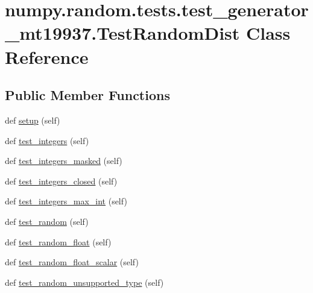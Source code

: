\hypertarget{classnumpy_1_1random_1_1tests_1_1test__generator__mt19937_1_1TestRandomDist}{}\section{numpy.\+random.\+tests.\+test\+\_\+generator\+\_\+mt19937.\+Test\+Random\+Dist Class Reference}
\label{classnumpy_1_1random_1_1tests_1_1test__generator__mt19937_1_1TestRandomDist}
\subsection*{Public Member Functions}
\begin{DoxyCompactItemize}
\item 
def \hyperlink{classnumpy_1_1random_1_1tests_1_1test__generator__mt19937_1_1TestRandomDist_a41df3d91f32b0588e1f120037f13ebbc}{setup} (self)
\item 
def \hyperlink{classnumpy_1_1random_1_1tests_1_1test__generator__mt19937_1_1TestRandomDist_a4376e4b3ace2e795d05ece36ddc61baa}{test\+\_\+integers} (self)
\item 
def \hyperlink{classnumpy_1_1random_1_1tests_1_1test__generator__mt19937_1_1TestRandomDist_a25b6f211c82b407abdea58a99f1ce392}{test\+\_\+integers\+\_\+masked} (self)
\item 
def \hyperlink{classnumpy_1_1random_1_1tests_1_1test__generator__mt19937_1_1TestRandomDist_a9de974a7757f5c9c1a377a2ae23eacbc}{test\+\_\+integers\+\_\+closed} (self)
\item 
def \hyperlink{classnumpy_1_1random_1_1tests_1_1test__generator__mt19937_1_1TestRandomDist_a7528925e29d47bbb4f0e53805ddd20d8}{test\+\_\+integers\+\_\+max\+\_\+int} (self)
\item 
def \hyperlink{classnumpy_1_1random_1_1tests_1_1test__generator__mt19937_1_1TestRandomDist_ab61c357a6e0db93796807ac7a23e4e39}{test\+\_\+random} (self)
\item 
def \hyperlink{classnumpy_1_1random_1_1tests_1_1test__generator__mt19937_1_1TestRandomDist_a930a965a83e9e6627642951f8c8ac9e1}{test\+\_\+random\+\_\+float} (self)
\item 
def \hyperlink{classnumpy_1_1random_1_1tests_1_1test__generator__mt19937_1_1TestRandomDist_a8e0435bd1fac0d74faa70a1df7a285eb}{test\+\_\+random\+\_\+float\+\_\+scalar} (self)
\item 
def \hyperlink{classnumpy_1_1random_1_1tests_1_1test__generator__mt19937_1_1TestRandomDist_a0a906f240338399ed7c6a4cfa130a392}{test\+\_\+random\+\_\+unsupported\+\_\+type} (self)

\end{DoxyCompactItemize}
